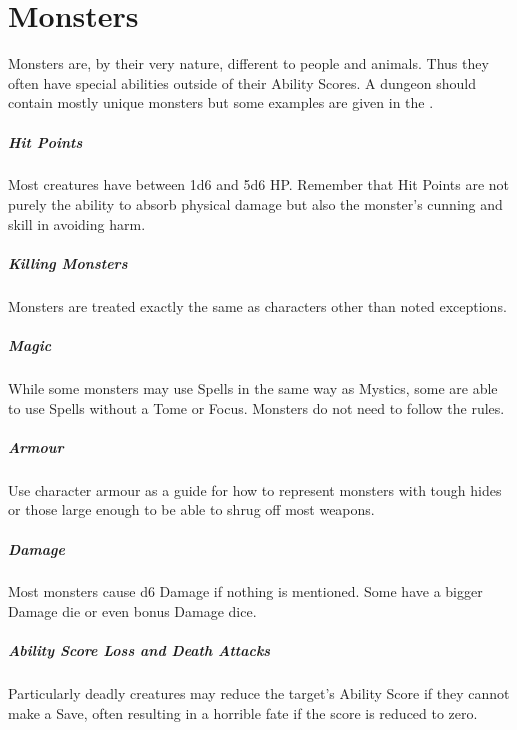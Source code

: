 \documentclass[itdr]{subfiles}
\begin{document}
\cleartoleftpage

\chapter{Monsters}
\label{ch:monsters}

Monsters are, by their very nature, different to people and animals. Thus they often have special abilities outside of their Ability Scores. A dungeon should contain mostly unique monsters but some examples are given in the \textbf{}.

\vfill
{}
\paragraph{Hit Points}
Most creatures have between 1d6 and 5d6 HP. Remember that Hit Points are not purely the ability to absorb physical damage but also the monster's cunning and skill in avoiding harm.

\vfill
\paragraph{Killing Monsters}
Monsters are treated exactly the same as characters other than noted exceptions.

\vfill
{}
\paragraph{Magic}
While some monsters may use Spells in the same way as Mystics, some are able to use Spells without a Tome or Focus. Monsters do not need to follow the rules.

\vfill
{}
\paragraph{Armour}
Use character armour as a guide for how to represent monsters with tough hides or those large enough to be able to shrug off most weapons.

\vfill
{}
\paragraph{Damage}
Most monsters cause d6 Damage if nothing is mentioned. Some have a bigger Damage die or even bonus Damage dice.

\vfill
{}
\paragraph{Ability Score Loss and Death Attacks}
Particularly deadly creatures may reduce the target's Ability Score if they cannot make a Save, often resulting in a horrible fate if the score is reduced to zero.
\end{document}
